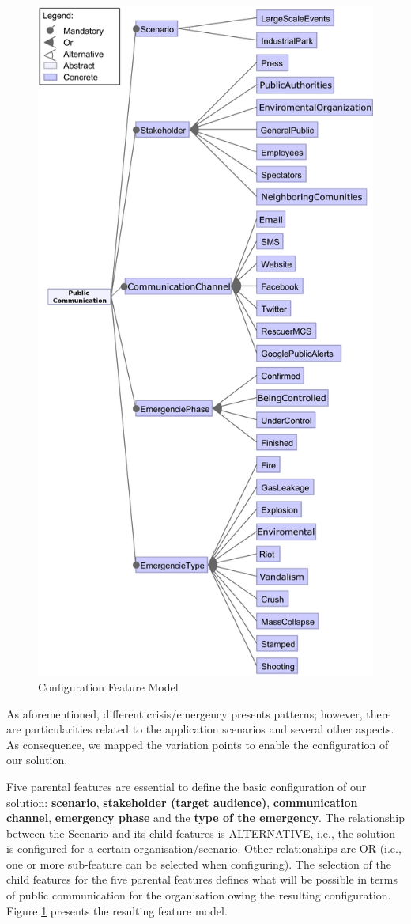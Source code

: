 \begin{figure}
\begin{center}
  \includegraphics[width=0.75\linewidth]{images/FMConfig3}
\caption{Configuration Feature Model}
\label{fig:FMConf}
\end{center}
\end{figure}

As aforementioned, different crisis/emergency presents patterns; however, there are particularities related to the application scenarios and several other aspects. As consequence, we mapped the variation points to enable the configuration of our solution. 

Five parental features are essential to define the basic configuration of our solution: \textbf{scenario}, \textbf{stakeholder (target audience)}, \textbf{communication channel}, \textbf{emergency phase} and the \textbf{type of the emergency}. The relationship between the Scenario and its child features is ALTERNATIVE, i.e., the solution is configured for a certain organisation/scenario. Other relationships are OR (i.e., one or more sub-feature can be selected when configuring). The selection of the child features for the five parental features defines what will be possible in terms of public communication for the organisation owing the resulting configuration. Figure \ref{fig:FMConf} presents the resulting feature model.

